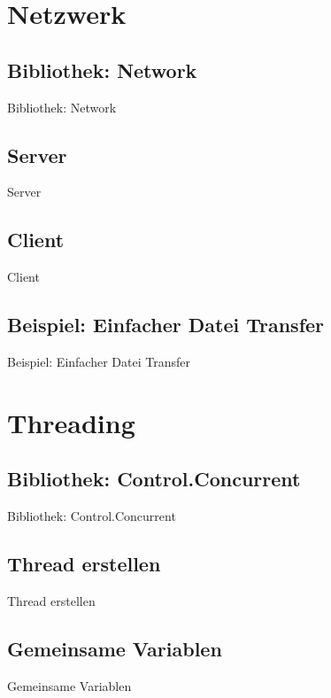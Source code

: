 \documentclass{beamer}
\begin{document}
\section{Netzwerk}
\subsection{Bibliothek: Network}
\begin{frame}{Bibliothek: Network}
\end{frame}

\subsection{Server}
\begin{frame}{Server}
\end{frame}

\subsection{Client}
\begin{frame}{Client}
\end{frame}

\subsection{Beispiel: Einfacher Datei Transfer}
\begin{frame}{Beispiel: Einfacher Datei Transfer}
\end{frame}

\section{Threading}
\subsection{Bibliothek: Control.Concurrent}
\begin{frame}{Bibliothek: Control.Concurrent}
\end{frame}

\subsection{Thread erstellen}
\begin{frame}{Thread erstellen}
\end{frame}

\subsection{Gemeinsame Variablen}
\begin{frame}{Gemeinsame Variablen}
\end{frame}
\end{document}
